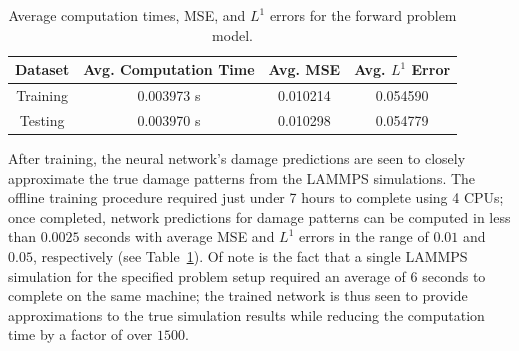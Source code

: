 \begin{table}
  \centering
  \begin{tabular}{c|c|c|c}
    Dataset  &  Avg. Computation Time  & Avg. MSE &  Avg. $L^1$ Error \\ \hline
    Training &    0.003973 s &    0.010214  &   0.054590  \\ 
    Testing  &    0.003970 s &    0.010298  &   0.054779  
  \end{tabular}
  \caption{Average computation times, MSE, and $L^1$ errors for the forward problem model.}
  \label{fig:forward_results_table}
\end{table}


After training, the neural network's damage predictions are seen to closely approximate the true damage patterns from the LAMMPS simulations.  The offline training procedure required just under 7 hours to complete using 4 CPUs; once completed, network predictions for damage patterns can be computed in less than $0.0025$ seconds with average MSE and $L^1$ errors in the range of $0.01$ and $0.05$, respectively (see Table~\ref{fig:forward_results_table}).  Of note is the fact that a single LAMMPS simulation for the specified problem setup required an average of $6$ seconds to complete on the same machine;  the trained network is thus seen to  provide approximations to the true simulation results while reducing the computation time  by a factor of over $1500$.




